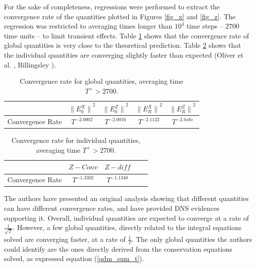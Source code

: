 \documentclass[aip,pof,reprint]{revtex4-1}
\begin{document}
For the sake of completeness, regressions were performed to extract the convergence rate of the quantities plotted in Figures \ref{fig_x} and \ref{fig_z}.
The regression was restricted to averaging times longer than $10^4$ time steps -- $2700$ time units -- to limit transient effects.
Table \ref{tab_conv_rate} shows that the convergence rate of global quantities is very close to the theoretical prediction.
Table \ref{tab_conv_rate_2} shows that the individual quantities are converging slightly faster than expected (Oliver et al. \cite{oliver}, Billingsley \cite{billingsley2008probability}).

\begin{table}
\caption{\label{tab_conv_rate}Convergence rate for global quantities, averaging time $T^+>2700$.}
\begin{ruledtabular}
\begin{tabular}{rcccc}
 & ${\parallel{E_0^X}\parallel}^2$ & ${\parallel{E_0^Z}\parallel}^2$ & ${\parallel{E_R^X}\parallel}^2$ & ${\parallel{E_R^Z}\parallel}^2$ \\
\hline
Convergence Rate & $T^{-2.0002}$ & $T^{-2.0016}$ & $T^{-2.1122}$ & $T^{-2.todo}$ \\
\end{tabular}
\end{ruledtabular}
\end{table}

\begin{table}
\caption{\label{tab_conv_rate_2}Convergence rate for individual quantities, averaging time $T^+>2700$.}
\begin{ruledtabular}
\begin{tabular}{rcccc}
 & $Z-Conv$ & $Z-diff$ \\
\hline
Convergence Rate & $T^{-1.3302}$ & $T^{-1.1340}$ \\
\end{tabular}
\end{ruledtabular}
\end{table}

The authors have presented an original analysis showing that different quantities can have different convergence rates, and have provided DNS evidences supporting it.
Overall, individual quantities are expected to converge at a rate of $\frac{1}{\sqrt{T}}$.
However, a few global quantities, directly related to the integral equations solved are converging faster, at a rate of $\frac{1}{T}$.
The only global quantities the authors could identify are the ones directly derived from the conservation equations solved, as expressed equation (\ref{qdm_sum_t}).
\end{document}

